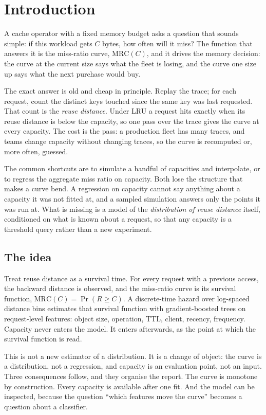 \section{Introduction}
\label{sec:introduction}
\label{sec:pagebudget}

A cache operator with a fixed memory budget asks a question that sounds simple:
if this workload gets $C$ bytes, how often will it miss? The function that answers
it is the miss-ratio curve, $\mathrm{MRC}(C)$, and it drives the memory decision:
the curve at the current size says what the fleet is losing, and the curve one
size up says what the next purchase would buy.

The exact answer is old and cheap in principle. Replay the trace; for each request,
count the distinct keys touched since the same key was last requested. That count
is the \emph{reuse distance}. Under LRU a request hits exactly when its reuse
distance is below the capacity, so one pass over the trace gives the curve at every
capacity. The cost is the pass: a production fleet has many traces, and teams
change capacity without changing traces, so the curve is recomputed or, more often,
guessed.

The common shortcuts are to simulate a handful of capacities and interpolate, or to
regress the aggregate miss ratio on capacity. Both lose the structure that makes a
curve bend. A regression on capacity cannot say anything about a capacity it was not
fitted at, and a sampled simulation answers only the points it was run at. What is
missing is a model of the \emph{distribution of reuse distance} itself, conditioned
on what is known about a request, so that any capacity is a threshold query rather
than a new experiment.

\subsection{The idea}
\label{sec:idea}

Treat reuse distance as a survival time. For every request with a previous access,
the backward distance is observed, and the miss-ratio curve is its survival
function, $\mathrm{MRC}(C)=\Pr(R\ge C)$. A discrete-time hazard over log-spaced
distance bins estimates that survival function with gradient-boosted trees on
request-level features: object size, operation, TTL, client, recency, frequency.
Capacity never enters the model. It enters afterwards, as the point at which the
survival function is read.

This is not a new estimator of a distribution. It is a change of object: the curve
is a distribution, not a regression, and capacity is an evaluation point, not an
input. Three consequences follow, and they organise the report. The curve is
monotone by construction. Every capacity is available after one fit. And the model
can be inspected, because the question ``which features move the curve'' becomes a
question about a classifier.

